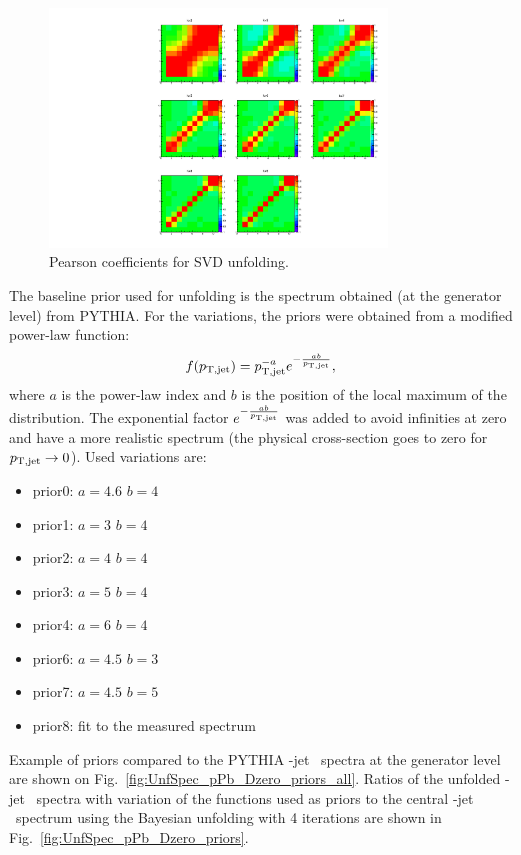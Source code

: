 \begin{figure}[bth]
\centering
\includegraphics[width=0.8\textwidth]{pPbcuts_2sig/unfolding/unfoldedSpectrum_Pearson_SVD}
\caption{Pearson coefficients for SVD unfolding.}
\label{fig:unfPearson_pPb_Dzero_SVD}
\end{figure}


The baseline prior used for unfolding is the spectrum obtained (at the generator level) from PYTHIA.
For the variations, the priors were obtained from a modified power-law function:
\begin{equation}
f(p_{\mathrm{T,jet}}) = p_{\mathrm{T,jet}}^{-a}e^{-\frac{ab}{p_{\mathrm{T,jet}}}},
\end{equation}
where $a$ is the power-law index and $b$ is the position of the local maximum of the distribution. The exponential factor $e^{-\frac{ab}{p_{\mathrm{T,jet}}}}$ was added to avoid infinities at zero and have a more realistic spectrum (the physical cross-section goes to zero for $p_{\mathrm{T,jet}} \to 0$).
Used variations are: 
\begin{itemize}
\item prior0: $a=4.6$ $b=4$~\GeVc\ 
\item prior1: $a=3$ $b=4$~\GeVc\
\item prior2: $a=4$ $b=4$~\GeVc\
\item prior3: $a=5$ $b=4$~\GeVc\
\item prior4: $a=6$ $b=4$~\GeVc\
\item prior6: $a=4.5$ $b=3$~\GeVc\
\item prior7: $a=4.5$ $b=5$~\GeVc\
\item prior8: fit to the measured spectrum
\end{itemize}


Example of priors compared to the PYTHIA \Dzero-jet \pt\ spectra at the generator level are shown on Fig.~\ref{fig:UnfSpec_pPb_Dzero_priors_all}.
Ratios of the unfolded \Dzero-jet \pt\ spectra with variation of the functions used as priors to the central \Dzero-jet \pt\ spectrum using the Bayesian unfolding with 4 iterations are shown in Fig.~\ref{fig:UnfSpec_pPb_Dzero_priors}. 

